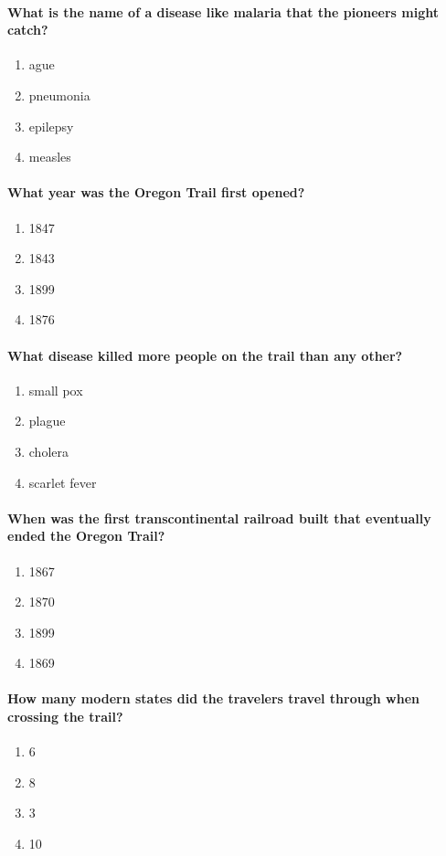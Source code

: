 		\paragraph{What is the name of a disease like malaria that the pioneers might catch?}
			\begin{enumerate}
				\item ague
				\item pneumonia
				\item epilepsy
				\item measles
			\end{enumerate}

		\paragraph{What year was the Oregon Trail first opened?}
			\begin{enumerate}
				\item 1847
				\item 1843
				\item 1899
				\item 1876
			\end{enumerate}

		\paragraph{What disease killed more people on the trail than any other?}
			\begin{enumerate}
				\item small pox
				\item plague
				\item cholera
				\item scarlet fever
			\end{enumerate}

		\paragraph{When was the first transcontinental railroad built that eventually ended the Oregon Trail?}
			\begin{enumerate}
				\item 1867
				\item 1870
				\item 1899
				\item 1869
			\end{enumerate}

		\paragraph{How many modern states did the travelers travel through when crossing the trail?}
			\begin{enumerate}
				\item 6
				\item 8
				\item 3
				\item 10
			\end{enumerate}

